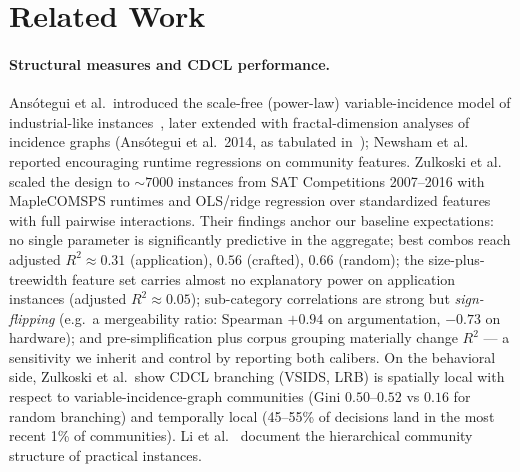 \documentclass[11pt]{article}
\begin{document}
\section{Related Work}
\label{sec:related}

\paragraph{Structural measures and CDCL performance.}
Ans\'otegui et al.\ introduced the scale-free (power-law) variable-incidence
model of industrial-like instances~\cite{ansotegui2009}, later extended with
fractal-dimension analyses of incidence graphs (Ans\'otegui et al.\ 2014, as
tabulated in~\cite{zulkoski2018}); Newsham et al.~\cite{newsham2014} reported encouraging runtime regressions on
community features. Zulkoski et al.~\cite{zulkoski2018} scaled the design to
${\sim}7000$ instances from SAT Competitions 2007--2016 with MapleCOMSPS
runtimes and OLS/ridge regression over standardized features with full
pairwise interactions. Their findings anchor our baseline expectations:
no single parameter is significantly predictive in the aggregate; best
combos reach adjusted $R^2 \approx 0.31$ (application), $0.56$ (crafted),
$0.66$ (random); the size-plus-treewidth feature set carries almost no
explanatory power on application instances (adjusted $R^2 \approx 0.05$);
sub-category correlations are strong but \emph{sign-flipping}
(e.g.\ a mergeability ratio: Spearman $+0.94$ on argumentation, $-0.73$ on
hardware); and pre-simplification plus corpus grouping materially change
$R^2$ --- a sensitivity we inherit and control by reporting both calibers.
On the behavioral side, Zulkoski et al.\ show CDCL branching (VSIDS, LRB) is
spatially local with respect to variable-incidence-graph communities (Gini
$0.50$--$0.52$ vs $0.16$ for random branching) and temporally local (45--55\%
of decisions land in the most recent 1\% of communities). Li et
al.~\cite{li2022} document the hierarchical community structure of practical
instances.
\end{document}
